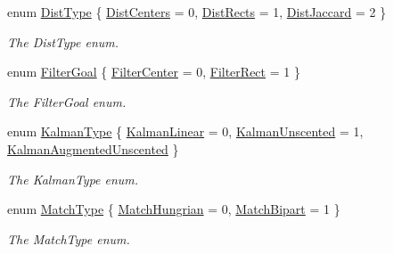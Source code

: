 \begin{DoxyCompactItemize}
enum \mbox{\hyperlink{namespacetracking_a55743c5e18b9b228c4ba2587260b2502}{Dist\+Type}} \{ \mbox{\hyperlink{namespacetracking_a55743c5e18b9b228c4ba2587260b2502a30176bdc0b4f965c6812767a2fa52e1e}{Dist\+Centers}} = 0, 
\mbox{\hyperlink{namespacetracking_a55743c5e18b9b228c4ba2587260b2502a43af27628a9ee8e94a23c079eab5d448}{Dist\+Rects}} = 1, 
\mbox{\hyperlink{namespacetracking_a55743c5e18b9b228c4ba2587260b2502a731b827afcbde6eb19624ad6130b1798}{Dist\+Jaccard}} = 2
 \}
\begin{DoxyCompactList}\small\item\em The Dist\+Type enum. \end{DoxyCompactList}\item 
enum \mbox{\hyperlink{namespacetracking_a9b3e7d16c86cd8b781ab214e396b0ebf}{Filter\+Goal}} \{ \mbox{\hyperlink{namespacetracking_a9b3e7d16c86cd8b781ab214e396b0ebfafac394783c1196957768400bc53ba491}{Filter\+Center}} = 0, 
\mbox{\hyperlink{namespacetracking_a9b3e7d16c86cd8b781ab214e396b0ebfabb259eae9513c55b313c553ce6249aea}{Filter\+Rect}} = 1
 \}
\begin{DoxyCompactList}\small\item\em The Filter\+Goal enum. \end{DoxyCompactList}\item 
enum \mbox{\hyperlink{namespacetracking_a83f2c4d58ea2737f7d6296dce3eb722a}{Kalman\+Type}} \{ \mbox{\hyperlink{namespacetracking_a83f2c4d58ea2737f7d6296dce3eb722aa889eca583e371386c92e05814797a885}{Kalman\+Linear}} = 0, 
\mbox{\hyperlink{namespacetracking_a83f2c4d58ea2737f7d6296dce3eb722aa39d914d61ae37e52ad325f55d199dabc}{Kalman\+Unscented}} = 1, 
\mbox{\hyperlink{namespacetracking_a83f2c4d58ea2737f7d6296dce3eb722aa442bc8be9c68f72f1bc7952153cbf4c7}{Kalman\+Augmented\+Unscented}}
 \}
\begin{DoxyCompactList}\small\item\em The Kalman\+Type enum. \end{DoxyCompactList}\item 
enum \mbox{\hyperlink{namespacetracking_a491e50c9261ab820965d871a217d4f13}{Match\+Type}} \{ \mbox{\hyperlink{namespacetracking_a491e50c9261ab820965d871a217d4f13a8c97315e46df8c0716a9538655fc967d}{Match\+Hungrian}} = 0, 
\mbox{\hyperlink{namespacetracking_a491e50c9261ab820965d871a217d4f13a41d2324dafb3393ff2cb54671c8b06ef}{Match\+Bipart}} = 1
 \}
\begin{DoxyCompactList}\small\item\em The Match\+Type enum. \end{DoxyCompactList}\item 

\end{DoxyCompactItemize}
